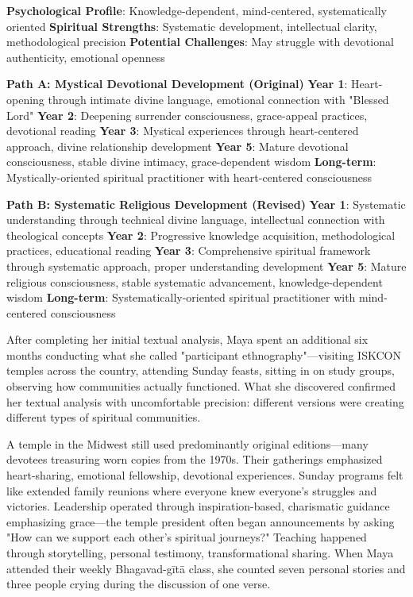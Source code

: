 \documentclass[12pt,twoside]{book}
\begin{document}
\textbf{\textbf{Psychological Profile}}: Knowledge-dependent, mind-centered, systematically oriented
\textbf{\textbf{Spiritual Strengths}}: Systematic development, intellectual clarity, methodological precision
\textbf{\textbf{Potential Challenges}}: May struggle with devotional authenticity, emotional openness

\textbf{\textbf{Path A: Mystical Devotional Development (Original)}}
\textbf{\textbf{Year 1}}: Heart-opening through intimate divine language, emotional connection with "Blessed Lord"
\textbf{\textbf{Year 2}}: Deepening surrender consciousness, grace-appeal practices, devotional reading
\textbf{\textbf{Year 3}}: Mystical experiences through heart-centered approach, divine relationship development
\textbf{\textbf{Year 5}}: Mature devotional consciousness, stable divine intimacy, grace-dependent wisdom
\textbf{\textbf{Long-term}}: Mystically-oriented spiritual practitioner with heart-centered consciousness

\textbf{\textbf{Path B: Systematic Religious Development (Revised)}}
\textbf{\textbf{Year 1}}: Systematic understanding through technical divine language, intellectual connection with theological concepts
\textbf{\textbf{Year 2}}: Progressive knowledge acquisition, methodological practices, educational reading
\textbf{\textbf{Year 3}}: Comprehensive spiritual framework through systematic approach, proper understanding development
\textbf{\textbf{Year 5}}: Mature religious consciousness, stable systematic advancement, knowledge-dependent wisdom
\textbf{\textbf{Long-term}}: Systematically-oriented spiritual practitioner with mind-centered consciousness

After completing her initial textual analysis, Maya spent an additional six months conducting what she called "participant ethnography"—visiting ISKCON temples across the country, attending Sunday feasts, sitting in on study groups, observing how communities actually functioned. What she discovered confirmed her textual analysis with uncomfortable precision: different versions were creating different types of spiritual communities.

A temple in the Midwest still used predominantly original editions—many devotees treasuring worn copies from the 1970s. Their gatherings emphasized heart-sharing, emotional fellowship, devotional experiences. Sunday programs felt like extended family reunions where everyone knew everyone's struggles and victories. Leadership operated through inspiration-based, charismatic guidance emphasizing grace—the temple president often began announcements by asking "How can we support each other's spiritual journeys?" Teaching happened through storytelling, personal testimony, transformational sharing. When Maya attended their weekly Bhagavad-gītā class, she counted seven personal stories and three people crying during the discussion of one verse.
\end{document}
